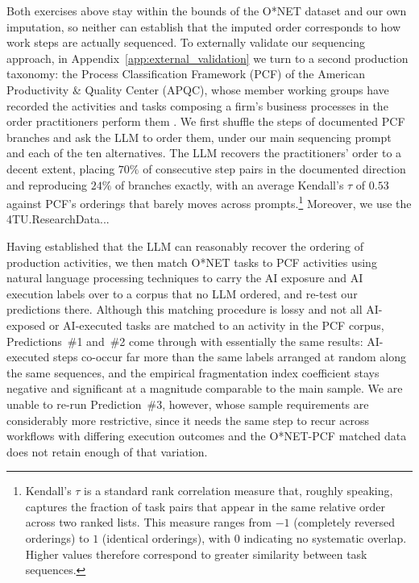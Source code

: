 Both exercises above stay within the bounds of the O*NET dataset and our own imputation, so neither can establish that the imputed order corresponds to how work steps are actually sequenced.
To externally validate our sequencing approach, in Appendix~\ref{app:external_validation} we turn to a second production taxonomy: the Process Classification Framework (PCF) of the American Productivity \& Quality Center (APQC), whose member working groups have recorded the activities and tasks composing a firm's business processes in the order practitioners perform them \citep{apqc_pcf}.
We first shuffle the steps of documented PCF branches and ask the LLM to order them, under our main sequencing prompt and each of the ten alternatives.
The LLM recovers the practitioners' order to a decent extent, placing $70\%$ of consecutive step pairs in the documented direction and reproducing $24\%$ of branches exactly, with an average Kendall's $\tau$ of $0.53$ against PCF's orderings that barely moves across prompts.\footnote{
Kendall's $\tau$ is a standard rank correlation measure that, roughly speaking, captures the fraction of task pairs that appear in the same relative order across two ranked lists.
This measure ranges from $-1$ (completely reversed orderings) to $1$ (identical orderings), with $0$ indicating no systematic overlap.  
Higher values therefore correspond to greater similarity between task sequences.
}
Moreover, we use the 4TU.ResearchData...

Having established that the LLM can reasonably recover the ordering of production activities, we then match O*NET tasks to PCF activities using natural language processing techniques to carry the AI exposure and AI execution labels over to a corpus that no LLM ordered, and re-test our predictions there.
Although this matching procedure is lossy and not all AI-exposed or AI-executed tasks are matched to an activity in the PCF corpus, Predictions~\#1 and~\#2 come through with essentially the same results: AI-executed steps co-occur far more than the same labels arranged at random along the same sequences, and the empirical fragmentation index coefficient stays negative and significant at a magnitude comparable to the main sample.
We are unable to re-run Prediction~\#3, however, whose sample requirements are considerably more restrictive, since it needs the same step to recur across workflows with differing execution outcomes and the O*NET-PCF matched data does not retain enough of that variation.